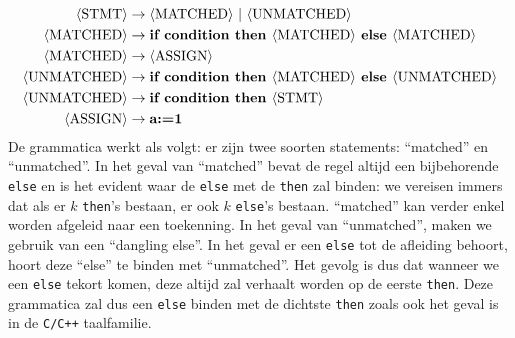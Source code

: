 \documentclass[a4paper]{article}
\newcommand{\rul}{\rightarrow}
\newcommand{\gvar}[1]{\langle \text{{#1}} \rangle}
\newcommand{\gend}[1]{\text{\bf{#1}}}
\begin{document}
\begin{question}
\begin{answer}
\paragraph{}
\begin{align*}
      \gvar{STMT}       & \rul \gvar{MATCHED} \ | \ \gvar{UNMATCHED}\\
      \gvar{MATCHED}    & \rul \gend{if condition then } \gvar{MATCHED} \gend{ else } \gvar{MATCHED}\\
      \gvar{MATCHED}    & \rul \gvar{ASSIGN}\\
      \gvar{UNMATCHED}	& \rul \gend{if condition then } \gvar{MATCHED} \gend{ else } \gvar{UNMATCHED} \\
      \gvar{UNMATCHED}	& \rul \gend{if condition then } \gvar{STMT}\\
      \gvar{ASSIGN}     & \rul \gend{a:=1} \\
  \end{align*}
De grammatica werkt als volgt: er zijn twee soorten statements: ``matched'' en ``unmatched''. In het geval van ``matched'' bevat de regel altijd een bijbehorende \texttt{else} en is het evident waar de \texttt{else} met de \texttt{then} zal binden: we vereisen immers dat als er $k$ \texttt{then}'s bestaan, er ook $k$ \texttt{else}'s bestaan. ``matched'' kan verder enkel worden afgeleid naar een toekenning. In het geval van ``unmatched'', maken we gebruik van een ``dangling else''. In het geval er een \texttt{else} tot de afleiding behoort, hoort deze ``else'' te binden met ``unmatched''. Het gevolg is dus dat wanneer we een \texttt{else} tekort komen, deze altijd zal verhaalt worden op de eerste \texttt{then}. Deze grammatica zal dus een \texttt{else} binden met de dichtste \texttt{then} zoals ook het geval is in de \texttt{C/C++} taalfamilie.
\end{answer}
\end{question}
\end{document}
